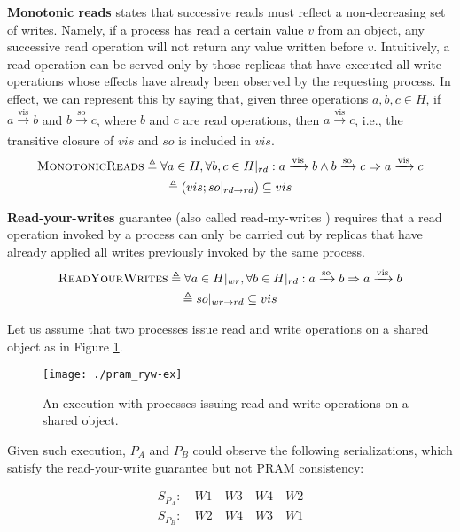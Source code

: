 \documentclass[letter, 11pt]{article}
\renewcommand{\cite}{\citep}
\begin{document}
\textbf{Monotonic reads} states that successive reads must reflect a non-decreasing set of writes. 
Namely, if a process has read a certain value $v$ from an object, any successive read operation will not return any value written before $v$.
Intuitively, a read operation can be served only by those replicas that have executed all write operations whose effects have already been observed by the requesting process.
In effect, we can represent this by saying that, given three operations $a,b,c \in H$, if $a \xrightarrow[]{\text{vis}} b$
and $b \xrightarrow[]{\text{so}} c$, where $b$ and $c$ are read operations, then $a \xrightarrow[]{\text{vis}} c$, i.e., the transitive
closure of $vis$ and $so$ is included in $vis$.
\begin{multline}
\textsc{MonotonicReads} \triangleq  
\forall a\in H, \forall b,c \in H|_{rd} : a \xrightarrow[]{\text{vis}} b \wedge b \xrightarrow[]{\text{so}} c \Rightarrow a \xrightarrow[]{\text{vis}} c \\
\triangleq (vis;so|_{rd \rightarrow rd}) \subseteq vis
\end{multline}

\textbf{Read-your-writes} guarantee (also called read-my-writes \cite{Terry.Prabhakaran.ea:13,Burckhardt:14})
requires that a read operation invoked by a process can only be carried out by replicas 
that have already applied all writes previously invoked by the same process.
\begin{multline}
\textsc{ReadYourWrites} \triangleq 
\forall a\in H|_{wr}, \forall b \in H|_{rd} : a \xrightarrow[]{\text{so}} b \Rightarrow
a \xrightarrow[]{\text{vis}} b\\
\triangleq so|_{wr \rightarrow rd} \subseteq vis
\end{multline}

Let us assume that two processes issue read and write operations on a shared object as in Figure \ref{fig:pram_ryw-ex}.
\begin{figure}[h]
	\centering
	\texttt{[image: ./pram\_ryw-ex]} 	\caption{An execution with processes issuing read and write operations on a shared object.}
	\label{fig:pram_ryw-ex}
\end{figure}

\noindent Given such execution, $P_A$ and $P_B$ could observe the following serializations, 
which satisfy the read-your-write guarantee but not PRAM consistency:

\begin{align} 
S_{P_{A}} : \quad W1 \quad W3 \quad W4 \quad W2 \tag{S.4}\\ 
S_{P_{B}} : \quad W2 \quad W4 \quad W3 \quad W1 \tag{S.5}
\end{align}
\end{document}
